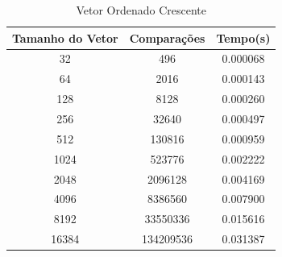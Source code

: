 \documentclass[12pt,a4paper,twoside]{report}
\begin{document}
\begin{table}[h]
  \centering
  \caption{Vetor Ordenado Crescente \label{tab:oc}}
  \begin{tabular}{ccc} \\\hline
  \textbf{Tamanho do Vetor} & \textbf{Comparações} & \textbf{Tempo(s)} \\\hline
  32                        & 496                  & 0.000068          \\\hline
  64                        & 2016                 & 0.000143          \\\hline
  128                       & 8128                 & 0.000260          \\\hline
  256                       & 32640                & 0.000497          \\\hline
  512                       & 130816               & 0.000959          \\\hline
  1024                      & 523776               & 0.002222          \\\hline
  2048                      & 2096128              & 0.004169          \\\hline
  4096                      & 8386560              & 0.007900          \\\hline
  8192                      & 33550336             & 0.015616          \\\hline
  16384                     & 134209536            & 0.031387          \\\hline
  \end{tabular}
\end{table}
\end{document}
